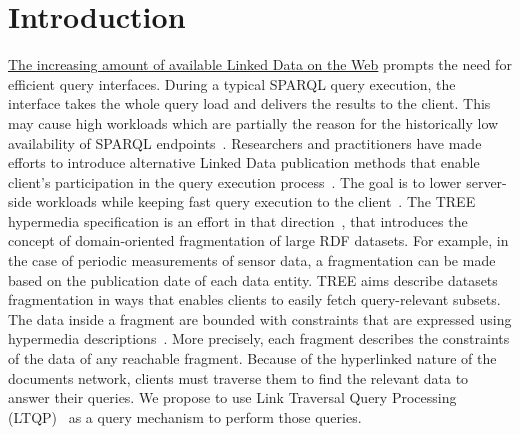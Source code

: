 \section{Introduction}



\href{https://lod-cloud.net/#diagram}{The increasing amount of available Linked Data on the Web} prompts the need for efficient query interfaces.
During a typical SPARQL query execution, the interface takes the whole query load and delivers the results to the client.
This may cause high workloads which are partially the reason for the historically low availability of SPARQL endpoints~\cite{aranda2013}.
Researchers and practitioners have made efforts to introduce alternative Linked Data publication methods that enable client's participation in the query execution process~\cite{Verborgh2016TriplePF}.
The goal is to lower server-side workloads while keeping fast query execution to the client~\cite{Azzam2021}.
The TREE hypermedia specification is an effort in that direction~\cite{ColpaertMaterializedTREE, lancker2021LDS}, that introduces the concept of domain-oriented fragmentation of large RDF datasets.
For example, in the case of periodic measurements of sensor data, a fragmentation can be made based on the publication date of each data entity.
TREE aims describe datasets fragmentation in ways that enables clients to easily fetch query-relevant subsets.
The data inside a fragment are bounded with constraints that are expressed using hypermedia descriptions~\cite{thomasFieldingPhdThesis}.
More precisely, each fragment describes the constraints of the data of any reachable fragment.
Because of the hyperlinked nature of the documents network, clients must traverse them to find the relevant data to answer their queries.
We propose to use Link Traversal Query Processing (LTQP)~\cite{Hartig2016} as a query mechanism to perform those queries.

